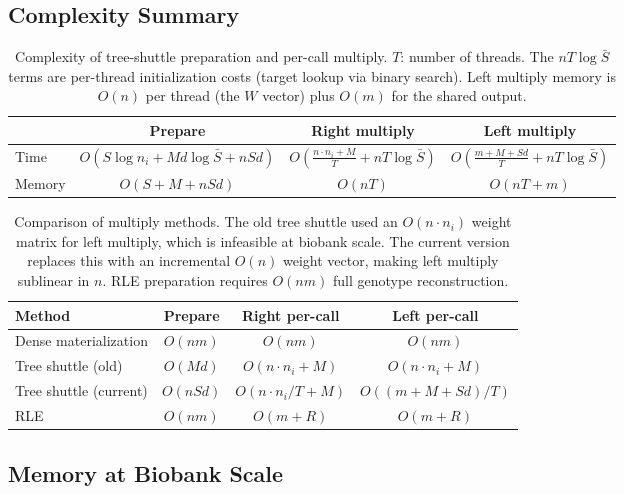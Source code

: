 \documentclass[11pt]{article}
\begin{document}
\subsection{Complexity Summary}

\begin{table}[h]
\centering
\begin{tabular}{l c c c}
\toprule
& Prepare & Right multiply & Left multiply \\
\midrule
Time & $O(S\!\log n_i + Md\!\log\bar{S} + nSd)$
     & $O\!\left(\frac{n \cdot n_i + M}{T}\! + nT\!\log\bar{S}\right)$
     & $O\!\left(\frac{m + M + Sd}{T}\! + nT\!\log\bar{S}\right)$ \\[4pt]
Memory & $O(S + M + nSd)$ & $O(nT)$ & $O(nT + m)$ \\
\bottomrule
\end{tabular}
\caption{Complexity of tree-shuttle preparation and per-call multiply.
$T$: number of threads.  The $nT\!\log\bar{S}$ terms are per-thread
initialization costs (target lookup via binary search).  Left multiply
memory is $O(n)$ per thread (the $W$ vector) plus $O(m)$ for the shared
output.}
\label{tab:complexity}
\end{table}

\begin{table}[h]
\centering
\begin{tabular}{l c c c}
\toprule
Method & Prepare & Right per-call & Left per-call \\
\midrule
Dense materialization  & $O(nm)$  & $O(nm)$ & $O(nm)$ \\
Tree shuttle (old)     & $O(Md)$  & $O(n \cdot n_i + M)$ & $O(n \cdot n_i + M)$ \\
Tree shuttle (current) & $O(nSd)$ & $O(n \cdot n_i / T + M)$ & $O((m + M + Sd)/T)$ \\
RLE                    & $O(nm)$  & $O(m + R)$ & $O(m + R)$ \\
\bottomrule
\end{tabular}
\caption{Comparison of multiply methods.  The old tree shuttle used an
$O(n \cdot n_i)$ weight matrix for left multiply, which is infeasible at
biobank scale.  The current version replaces this with an incremental
$O(n)$ weight vector, making left multiply sublinear in $n$.  RLE
preparation requires $O(nm)$ full genotype reconstruction.}
\label{tab:comparison}
\end{table}

\subsection{Memory at Biobank Scale}
\end{document}
